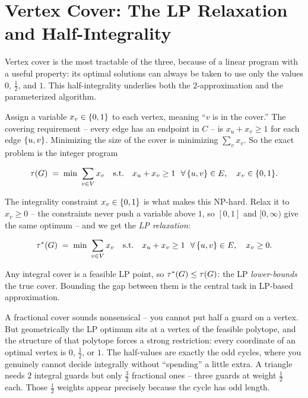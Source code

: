 \section{Vertex Cover: The LP Relaxation and Half-Integrality}
\label{ch29:lp}

Vertex cover is the most tractable of the three, because of a linear program with a useful property: its optimal solutions can always be taken to use only the values $0$, $\tfrac12$, and $1$. This half-integrality underlies both the $2$-approximation and the parameterized algorithm.

Assign a variable $x_v\in\{0,1\}$ to each vertex, meaning ``$v$ is in the
cover.'' The covering requirement -- every edge has an endpoint in $C$ -- is
$x_u+x_v\ge 1$ for each edge $\{u,v\}$. Minimizing the size of the cover is
minimizing $\sum_v x_v$. So the exact problem is the integer program

\begin{equation}
\label{ch29:ip}
\tau(G)\;=\;\min\ \sum_{v\in V} x_v
  \quad\text{s.t.}\quad x_u+x_v\ge 1\ \ \forall\,\{u,v\}\in E,\quad x_v\in\{0,1\}.
\end{equation}

The integrality constraint $x_v\in\{0,1\}$ is what makes this NP-hard. Relax it
to $x_v\ge 0$ -- the constraints never push a variable above $1$, so $[0,1]$ and
$[0,\infty)$ give the same optimum -- and we get the \emph{LP relaxation}:

\begin{equation}
\label{ch29:lp-relax}
\tau^*(G)\;=\;\min\ \sum_{v\in V} x_v
  \quad\text{s.t.}\quad x_u+x_v\ge 1\ \ \forall\,\{u,v\}\in E,\quad x_v\ge 0.
\end{equation}

Any integral cover is a feasible LP point, so $\tau^*(G)\le\tau(G)$: the LP
\emph{lower-bounds} the true cover. Bounding the gap between them is the
central task in LP-based approximation.

\begin{intuitionbox}
A fractional cover sounds nonsensical -- you cannot put half a guard on a
vertex. But geometrically the LP optimum sits at a vertex of the feasible
polytope, and the structure of that polytope forces a strong restriction:
every coordinate of an optimal vertex is $0$, $\tfrac12$, or $1$. The
half-values are exactly the odd cycles, where you genuinely cannot decide
integrally without ``spending'' a little extra. A triangle needs $2$ integral
guards but only $\tfrac32$ fractional ones -- three guards at weight $\tfrac12$
each. Those $\tfrac12$ weights appear precisely because the cycle has odd length.
\end{intuitionbox}

